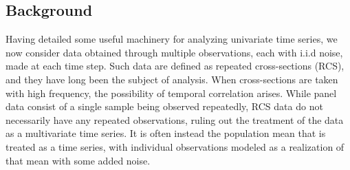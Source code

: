 \subsection{Background}
    
    
    
    

    Having detailed some useful machinery for analyzing univariate time series, we now consider data obtained through multiple observations, each with i.i.d noise, made at each time step. Such data are defined as repeated cross-sections (RCS), and they have long been the subject of analysis. When cross-sections are taken with high frequency, the possibility of temporal correlation arises. While panel data consist of a single sample being observed repeatedly, RCS data do not necessarily have any repeated observations, ruling out the treatment of the data as a multivariate time series. It is often instead the population mean that is treated as a time series, with individual observations modeled as a realization of that mean with some added noise.


    
    
    
    
    
    
    